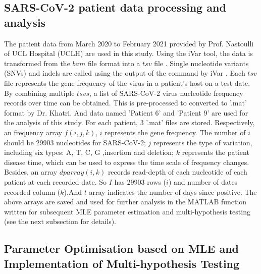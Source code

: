 \documentclass[12pt]{article}
\begin{document}
\subsection{SARS-CoV-2 patient data processing and analysis} 
The patient data from March 2020 to February 2021 provided by Prof. Nastoulli of UCL Hospital (UCLH) are used in this study. Using the iVar tool, the data is transformed from the $bam$ file format into a $tsv$ file \citep{danecek2011variant}. Single nucleotide variants (SNVs) and indels are called using the output of the command by iVar \citep{grubaugh2019amplicon}. Each $tsv$ file represents the gene frequency of the virus in a patient's host on a test date. By combining multiple $tsvs$, a list of SARS-CoV-2 virus nucleotide frequency records over time can be obtained. This is pre-processed to converted to '.mat' format by Dr. Khatri. And data named 'Patient 6' and 'Patient 9' are used for the analysis of this study.  For each patient, 3 '.mat' files are stored. Respectively, an frequency array $f(i, j, k)$, $i$ represents the gene frequency. The number of $i$ should be 29903 nucleotides \citep{wu2020new} for SARS-CoV-2; $j$ represents the type of variation, including six types: A, T, C, G ,insertion and deletion; $k$ represents the patient disease time, which can be used to express the time scale of frequency changes. Besides, an array $dparray(i,k)$ records read-depth \citep{grubaugh2019amplicon} of each nucleotide of each patient at each recorded date. So $I$ has 29903 rows ($i$) and number of dates recorded column ($k$).And $t$ array indicates the number of days since positive. The above arrays are saved and used for further analysis in the MATLAB function written for subsequent MLE parameter estimation and multi-hypothesis testing (see the next subsection for details).\\




\vfill
\subsection{Parameter Optimisation based on MLE and Implementation of Multi-hypothesis Testing} 
\end{document}
